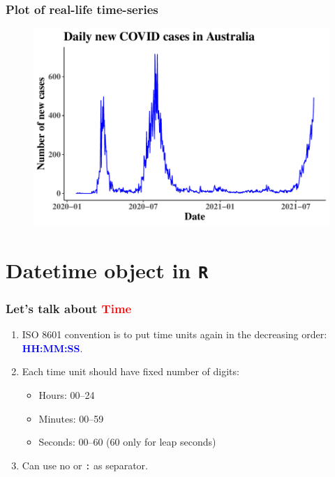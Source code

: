 \documentclass{beamer}
\begin{document}
\begin{frame}\frametitle{Plot of real-life time-series}
\begin{figure}
\includegraphics[width=0.99\linewidth]{PlotsLec4/CovidSeries}
\end{figure}
\end{frame}

\section{Datetime object in \texttt{R}}

\begin{frame}\frametitle{Let's talk about \textbf{\textcolor{red}{Time}}}
\begin{enumerate}
\item ISO 8601 convention is to put time units again in the decreasing order: \textcolor{blue}{\textbf{HH:MM:SS}}. 
\vspace{0.3in}
\item Each time unit should have fixed number of digits:
\begin{itemize}
\item Hours: 00--24
\item Minutes: 00--59
\item Seconds: 00--60 (60 only for leap seconds)
\end{itemize}
\vspace{0.3in}
\item Can use no or \texttt{:} as separator.
\end{enumerate}
\end{frame}
\end{document}
